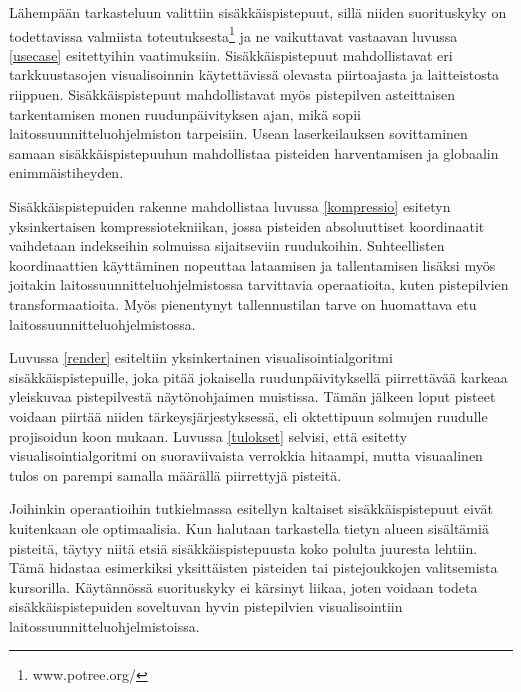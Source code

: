 Lähempään tarkasteluun valittiin sisäkkäispistepuut, sillä niiden suorituskyky on todettavissa valmiista toteutuksesta\footnote{www.potree.org/} ja ne vaikuttavat vastaavan luvussa \ref{usecase} esitettyihin vaatimuksiin. Sisäkkäispistepuut mahdollistavat eri tarkkuustasojen visualisoinnin käytettävissä olevasta piirtoajasta ja laitteistosta riippuen. Sisäkkäispistepuut mahdollistavat myös pistepilven asteittaisen tarkentamisen monen ruudunpäivityksen ajan, mikä sopii laitossuunnitteluohjelmiston tarpeisiin. Usean laserkeilauksen sovittaminen samaan sisäkkäispistepuuhun mahdollistaa pisteiden harventamisen ja globaalin enimmäistiheyden. 

Sisäkkäispistepuiden rakenne mahdollistaa luvussa \ref{kompressio} esitetyn yksinkertaisen kompressiotekniikan, jossa pisteiden absoluuttiset koordinaatit vaihdetaan indekseihin solmuissa sijaitseviin ruudukoihin. Suhteellisten koordinaattien käyttäminen nopeuttaa lataamisen ja tallentamisen lisäksi myös joitakin laitossuunnitteluohjelmistossa tarvittavia operaatioita, kuten pistepilvien transformaatioita. Myös pienentynyt tallennustilan tarve on huomattava etu laitossuunnitteluohjelmistossa.
 
Luvussa \ref{render} esiteltiin yksinkertainen visualisointialgoritmi sisäkkäispistepuille, joka pitää jokaisella ruudunpäivityksellä piirrettävää karkeaa yleiskuvaa pistepilvestä näytönohjaimen muistissa. Tämän jälkeen loput pisteet voidaan piirtää niiden tärkeysjärjestyksessä, eli oktettipuun solmujen ruudulle projisoidun koon mukaan. Luvussa \ref{tulokset} selvisi, että esitetty visualisointialgoritmi on suoraviivaista verrokkia hitaampi, mutta visuaalinen tulos on parempi samalla määrällä piirrettyjä pisteitä.    

Joihinkin operaatioihin tutkielmassa esitellyn kaltaiset sisäkkäispistepuut eivät kuitenkaan ole optimaalisia. Kun halutaan tarkastella tietyn alueen sisältämiä pisteitä, täytyy niitä etsiä sisäkkäispistepuusta koko polulta juuresta lehtiin. Tämä hidastaa esimerkiksi yksittäisten pisteiden tai pistejoukkojen valitsemista kursorilla. Käytännössä suorituskyky ei kärsinyt liikaa, joten voidaan todeta sisäkkäispistepuiden soveltuvan hyvin pistepilvien visualisointiin laitossuunnitteluohjelmistoissa.
